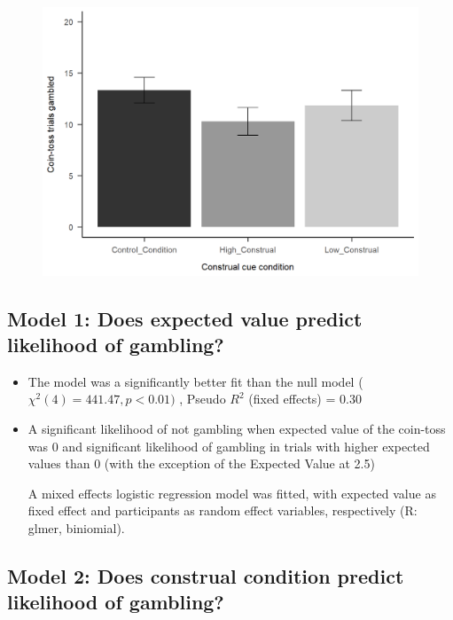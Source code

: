 \documentclass[
  letterpaper,
  DIV=11,
  numbers=noendperiod]{scrartcl}
\begin{document}
\begin{figure}[H]

{\centering \includegraphics[width=4.48in,height=\textheight]{img/study1_meanGambled.png}

}

\end{figure}

\hypertarget{model-1-does-expected-value-predict-likelihood-of-gambling}{%
\subsection{Model 1: Does expected value predict likelihood of
gambling?}\label{model-1-does-expected-value-predict-likelihood-of-gambling}}

\begin{itemize}
\item
  The model was a significantly better fit than the null model
  (\(χ^2(4) = 441.47, p < 0.01)\) , Pseudo \(R^2\) (fixed effects) =
  0.30
\item
  A significant likelihood of not gambling when expected value of the
  coin-toss was 0 and significant likelihood of gambling in trials with
  higher expected values than 0 (with the exception of the Expected
  Value at 2.5)

  A mixed effects logistic regression model was fitted, with expected
  value as fixed effect and participants as random effect variables,
  respectively (R: glmer, biniomial).
\end{itemize}

\hypertarget{model-2-does-construal-condition-predict-likelihood-of-gambling}{%
\subsection{Model 2: Does construal condition predict likelihood of
gambling?}\label{model-2-does-construal-condition-predict-likelihood-of-gambling}}
\end{document}

